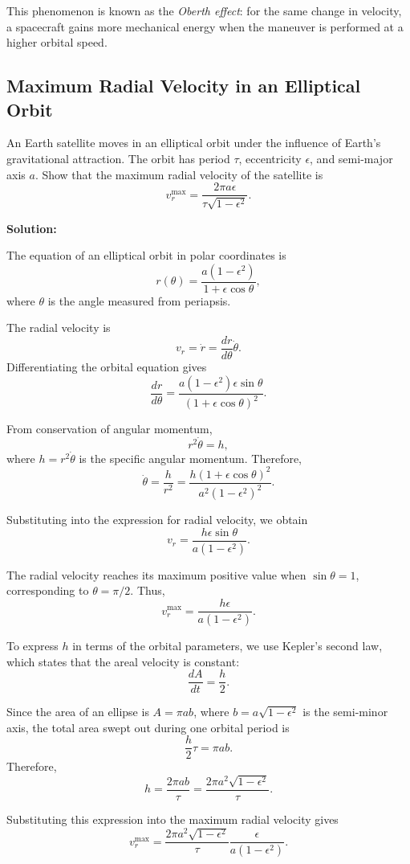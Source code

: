 \documentclass[12pt]{article}
\begin{document}
This phenomenon is known as the \emph{Oberth effect}: for the
same change in velocity, a spacecraft gains more mechanical
energy when the maneuver is performed at a higher orbital speed.

\subsection{Maximum Radial Velocity in an Elliptical Orbit}

An Earth satellite moves in an elliptical orbit under the influence
of Earth's gravitational attraction. The orbit has period $\tau$,
eccentricity $\epsilon$, and semi-major axis $a$.
Show that the maximum radial velocity of the satellite is
\[
v_r^{\max}=\frac{2\pi a\epsilon}{\tau\sqrt{1-\epsilon^2}}.
\]

\textbf{Solution:}

The equation of an elliptical orbit in polar coordinates is
\[
r(\theta)=\frac{a(1-\epsilon^2)}{1+\epsilon\cos\theta},
\]
where $\theta$ is the angle measured from periapsis.

The radial velocity is
\[
v_r=\dot r=\frac{dr}{d\theta}\dot\theta.
\]
Differentiating the orbital equation gives
\[
\frac{dr}{d\theta}
=\frac{a(1-\epsilon^2)\epsilon\sin\theta}
{(1+\epsilon\cos\theta)^2}.
\]

From conservation of angular momentum,
\[
r^2\dot\theta=h,
\]
where $h=r^2\dot\theta$ is the specific angular momentum.
Therefore,
\[
\dot\theta
=\frac{h}{r^2}
=\frac{h(1+\epsilon\cos\theta)^2}
{a^2(1-\epsilon^2)^2}.
\]

Substituting into the expression for radial velocity, we obtain
\[
v_r
=\frac{h\epsilon\sin\theta}{a(1-\epsilon^2)}.
\]

The radial velocity reaches its maximum positive value when
$\sin\theta=1$, corresponding to $\theta=\pi/2$. Thus,
\[
v_r^{\max}
=\frac{h\epsilon}{a(1-\epsilon^2)}.
\]

To express $h$ in terms of the orbital parameters, we use
Kepler's second law, which states that the areal velocity is constant:
\[
\frac{dA}{dt}=\frac{h}{2}.
\]

Since the area of an ellipse is $A=\pi ab$, where
$b=a\sqrt{1-\epsilon^2}$ is the semi-minor axis, the total
area swept out during one orbital period is
\[
\frac{h}{2}\tau=\pi ab.
\]
Therefore,
\[
h=\frac{2\pi ab}{\tau}
=\frac{2\pi a^2\sqrt{1-\epsilon^2}}{\tau}.
\]

Substituting this expression into the maximum radial velocity gives
\[
v_r^{\max}
=\frac{2\pi a^2\sqrt{1-\epsilon^2}}{\tau}
\frac{\epsilon}{a(1-\epsilon^2)}.
\]
\end{document}
